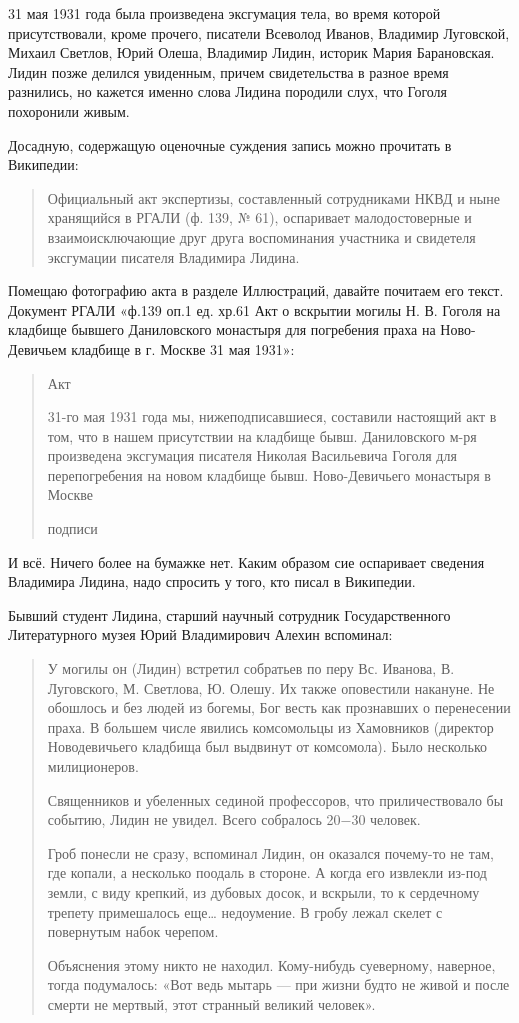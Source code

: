 \documentclass[a5paper,11pt,openany]{article}
\begin{document}
31 мая 1931 года была произведена эксгумация тела, во время которой присутствовали, кроме прочего, писатели Всеволод Иванов, Владимир Луговской, Михаил Светлов, Юрий Олеша, Владимир Лидин, историк Мария Барановская. Лидин позже делился увиденным, причем свидетельства в разное время разнились, но кажется именно слова Лидина породили слух, что Гоголя похоронили живым.

Досадную, содержащую оценочные суждения запись можно прочитать в Википедии: 

\begin{quotation}
Официальный акт экспертизы, составленный сотрудниками НКВД и ныне хранящийся в РГАЛИ (ф. 139, № 61), оспаривает малодостоверные и взаимоисключающие друг друга воспоминания участника и свидетеля эксгумации писателя Владимира Лидина.
\end{quotation}

Помещаю фотографию акта в разделе Иллюстраций, давайте почитаем его текст. Документ РГАЛИ «ф.139 оп.1 ед. хр.61 Акт о вскрытии могилы Н. В. Гоголя на кладбище бывшего Даниловского монастыря для погребения праха на Ново-Девичьем кладбище в г. Москве 31 мая 1931»:

\begin{quotation}
Акт

31-го мая 1931 года мы, нижеподписавшиеся, составили настоящий акт в том, что в нашем присутствии на кладбище бывш. Даниловского м-ря произведена эксгумация писателя Николая Васильевича Гоголя для перепогребения на новом кладбище бывш. Ново-Девичьего монастыря в Москве

подписи
\end{quotation}

И всё. Ничего более на бумажке нет. Каким образом сие оспаривает сведения Владимира Лидина, надо спросить у того, кто писал в Википедии.

Бывший студент Лидина, старший научный сотрудник Государственного Литературного музея Юрий Владимирович Алехин вспоминал: 

\begin{quotation}
У могилы он (Лидин) встретил собратьев по перу Вс. Иванова, В. Луговского, М. Светлова, Ю. Олешу. Их также оповестили накануне. Не обошлось и без людей из богемы, Бог весть как прознавших о перенесении праха. В большем числе явились комсомольцы из Хамовников (директор Новодевичьего кладбища был выдвинут от комсомола). Было несколько милиционеров.

Священников и убеленных сединой профессоров, что приличествовало бы событию, Лидин не увидел. Всего собралось 20−30 человек. 

Гроб понесли не сразу, вспоминал Лидин, он оказался почему-то не там, где копали, а несколько поодаль в стороне. А когда его извлекли из-под земли, с виду крепкий, из дубовых досок, и вскрыли, то к сердечному трепету примешалось еще… недоумение. В гробу лежал скелет с повернутым набок черепом. 

Объяснения этому никто не находил. Кому-нибудь суеверному, наверное, тогда подумалось: «Вот ведь мытарь — при жизни будто не живой и после смерти не мертвый, этот странный великий человек». 
\end{quotation}
\end{document}
